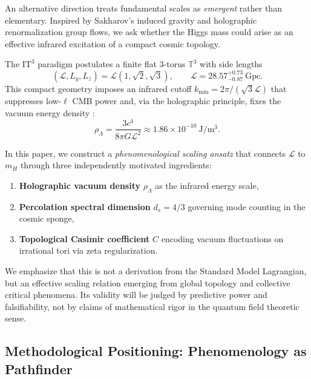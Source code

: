 \documentclass[11pt,a4paper]{article}
\newcommand{\ITthree}{\ensuremath{\mathrm{IT}^3}}
\newcommand{\Ltop}{\ensuremath{\mathcal{L}}}
\newcommand{\rhoLambda}{\ensuremath{\rho_\Lambda}}
\begin{document}
An alternative direction treats fundamental scales as \textit{emergent} rather 
than elementary. Inspired by Sakharov's induced gravity and holographic 
renormalization group flows, we ask whether the Higgs mass could arise as an 
effective infrared excitation of a compact cosmic topology.

The $\ITthree$ paradigm postulates a finite flat 3-torus $\mathbb{T}^3$ with 
side lengths
\begin{equation}
(\Ltop, L_y, L_z) = \Ltop \left(1, \sqrt{2}, \sqrt{3}\right), \qquad 
\Ltop = 28.57^{+0.73}_{-0.87}~\mathrm{Gpc}.
\label{eq:topology}
\end{equation}
This compact geometry imposes an infrared cutoff $k_{\min} = 2\pi/(\sqrt{3}\Ltop)$ 
that suppresses low-$\ell$ CMB power \citep{Logvinovich2026a} and, via the 
holographic principle, fixes the vacuum energy density \citep{Logvinovich2026g}:
\begin{equation}
\rhoLambda = \frac{3c^4}{8\pi G \Ltop^2} \approx 1.86 \times 10^{-10}~\mathrm{J/m^3}.
\label{eq:rhoLambda}
\end{equation}

In this paper, we construct a \textit{phenomenological scaling ansatz} that 
connects $\Ltop$ to $m_H$ through three independently motivated ingredients:
\begin{enumerate}
    \item \textbf{Holographic vacuum density} $\rhoLambda$ as the infrared energy scale,
    \item \textbf{Percolation spectral dimension} $d_s = 4/3$ governing mode counting 
          in the cosmic sponge,
    \item \textbf{Topological Casimir coefficient} $C$ encoding vacuum fluctuations 
          on irrational tori via zeta regularization.
\end{enumerate}

We emphasize that this is not a derivation from the Standard Model Lagrangian, 
but an effective scaling relation emerging from global topology and collective 
critical phenomena. Its validity will be judged by predictive power and 
falsifiability, not by claims of mathematical rigor in the quantum field 
theoretic sense.

\subsection*{Methodological Positioning: Phenomenology as Pathfinder}
\label{subsec:methodology}
\end{document}

